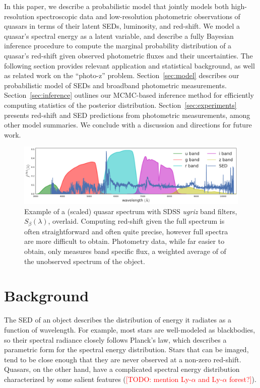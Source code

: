 \documentclass{article}
\newcommand{\red}[1]{\textcolor{red}{[TODO: #1]}}
\begin{document}
In this paper, we describe a probabilistic model that jointly models both high-resolution spectroscopic data and low-resolution photometric observations of quasars in terms of their latent SEDs, luminosity, and red-shift.  We model a quasar's spectral energy as a latent variable, and describe a fully Bayesian inference procedure to compute the marginal probability distribution of a quasar's red-shift given observed photometric fluxes and their uncertainties.  The following section provides relevant application and statistical background, as well as related work on the ``photo-z'' problem.  Section~\ref{sec:model} describes our probabilistic model of SEDs and broadband photometric measurements.  Section~\ref{sec:inference} outlines our MCMC-based inference method for efficiently computing statistics of the posterior distribution. Section~\ref{sec:experiments} presents red-shift and SED predictions from photometric measurements, among other model summaries.  We conclude with a discussion and directions for future work.  


\begin{figure}[ht]
\vskip 0.2in
\begin{center}
\centerline{\includegraphics[width=2\columnwidth]{../figs/quasar_spectrum_sdss_filters}}
\caption{Example of a (scaled) quasar spectrum with SDSS \emph{ugriz} band filters, $S_{\beta}(\lambda)$, overlaid.  Computing red-shift given the full spectrum is often straightforward and often quite precise, however full spectra are more difficult to obtain.  Photometry data, while far easier to obtain, only measures band specific flux, a weighted average of of the unobserved spectrum of the object. }
\label{fig:filters}
\end{center}
\vskip -0.2in
\end{figure} 


\section{Background}
\label{sec:background}
The SED of an object describes the distribution of energy it radiates as a function of wavelength.  
For example, most stars are well-modeled as blackbodies, so their spectral radiance closely follows Planck's law, which describes a parametric form for the spectral energy distribution.  Stars that can be imaged, tend to be close enough that they are never observed at a non-zero red-shift. 
Quasars, on the other hand, have a complicated spectral energy distribution characterized by some salient features (\red{mention Ly-$\alpha$ and Ly-$\alpha$ forest?}).  
\end{document}
